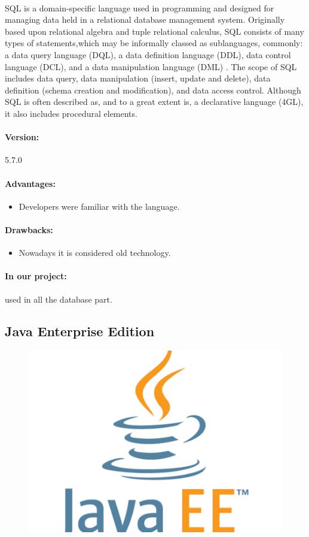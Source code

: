 \documentclass{article}
\begin{document}
		\paragraph{}SQL is a domain-specific language used in programming and designed for managing data held in a relational database management system. Originally based upon relational algebra and tuple relational calculus, SQL consists of many types of statements,which may be informally classed as sublanguages, commonly: a data query language (DQL), a data definition language (DDL), data control language (DCL), and a data manipulation language (DML) . The scope of SQL includes data query, data manipulation (insert, update and delete), data definition (schema creation and modification), and data access control. Although SQL is often described as, and to a great extent is, a declarative language (4GL), it also includes procedural elements.
		\paragraph{Version:} 5.7.0
		\paragraph{Advantages:}
		\begin{itemize}
			\item{}Developers were familiar with the language.
		\end{itemize}
		\paragraph{Drawbacks:}
		\begin{itemize}
			\item{}Nowadays it is considered old technology.
		\end{itemize}
		\paragraph{In our project:} used in all the database part.
	\subsection{Java Enterprise Edition}
			\begin{figure}[H]
			\begin{center}
			\includegraphics[width=.2\linewidth]{Images/Appendix/javaee.png}
			\label{fig:JEE}
			\end{center}
			\end{figure}		
\end{document}
